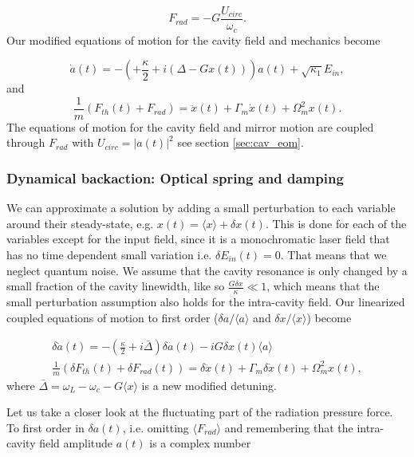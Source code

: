 \begin{equation}
F_{rad} = -G\frac{U_{circ}}{\omega_c}.
\end{equation}
\noindent
Our modified equations of motion for the cavity field and mechanics become

\begin{equation}
\dot{a}(t) = -\left( + \frac{\kappa}{2} + i(\Delta - Gx(t)) \right)a(t) + \sqrt{\kappa_1}E_{in},
\end{equation}
\noindent
and
\begin{equation}
\frac{1}{m}\left( F_{th}(t) + F_{rad} \right) =\ddot{x}(t) + \Gamma_m\dot{x}(t) + \Omega_m^2x(t).
\end{equation}
\noindent
The equations of motion for the cavity field and mirror motion are coupled through $F_{rad}$ with $U_{circ} = \left| a(t) \right|^2$ see section \ref{sec:cav_eom}.

\subsubsection{Dynamical backaction: Optical spring and damping}
We can approximate a solution by adding a small perturbation to each variable around their steady-state, e.g. $x(t) =  \langle x \rangle + \delta x(t)$. This is done for each of the variables except for the input field, since it is a monochromatic laser field that has no time dependent small variation i.e. $\delta E_{in}(t) = 0$. That means that we neglect quantum noise. We assume that the cavity resonance is only changed by a small fraction of the cavity linewidth, like so $\frac{G\delta x}{\kappa} \ll 1$, which means that the small perturbation assumption also holds for the intra-cavity field. Our linearized coupled equations of motion to first order ($\delta a/\langle a \rangle$ and $\delta x/\langle x \rangle$) become

\begin{align}
\delta \dot{a}(t) = -\left(\frac{\kappa}{2} + i\bar{\Delta}\right)\delta a(t) - iG\delta x(t)\langle a \rangle \label{eq:a_fluc} \\
\frac{1}{m}\left( \delta F_{th}(t) + \delta F_{rad}(t) \right) = \delta \ddot{x}(t) + \Gamma_m\delta\dot{x}(t) + \Omega_m^2x(t) \label{eq:x_fluc},
\end{align}
\noindent
where $\bar{\Delta} = \omega_L - \omega_c -G\langle x \rangle$ is a new modified detuning.

Let us take a closer look at the fluctuating part of the radiation pressure force. To first order in $\delta a(t)$, i.e. omitting $\langle F_{rad}\rangle$ and remembering that the intra-cavity field amplitude $a(t)$ is a complex number


